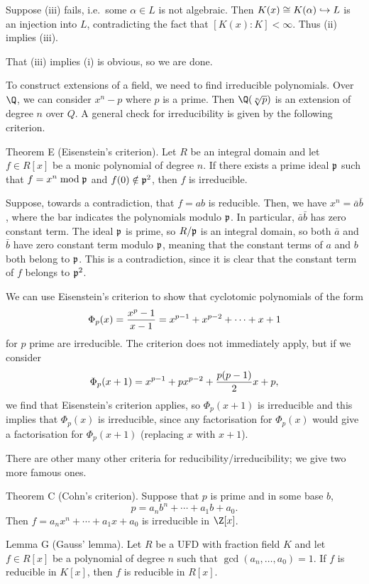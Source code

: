 Suppose (iii) fails, i.e.\ some $\alpha\in L$ is not algebraic. Then $K(x) \cong K(\alpha) \hookrightarrow L$ is an injection into $L$, contradicting the fact that $[K(x) : K] < \infty$. Thus (ii) implies (iii).

That (iii) implies (i) is obvious, so we are done.\slug

To construct extensions of a field, we need to find irreducible polynomials. Over $\Q$, we can consider $x^n - p$ where $p$ is a prime. Then $\Q(\root n\of p)$ is an extension of degree $n$ over $Q$. A general check for irreducibility is given by the following criterion.

\parenproclaim Theorem E (Eisenstein's criterion). Let $R$ be an integral domain and let $f\in R[x]$ be a monic polynomial of degree $n$. If there exists a prime ideal $\frak p$ such that $f = x^n \bmod \frak p$ and $f(0) \notin \frak p^2$, then $f$ is irreducible.

\proof Suppose, towards a contradiction, that $f = ab$ is reducible. Then, we have $x^n = \bar a \bar b$, where the bar indicates the polynomials modulo $\frak p$. In particular, $\bar a\bar b$ has zero constant term. The ideal $\frak p$ is prime, so $R/\frak p$ is an integral domain, so both $\bar a$ and $\bar b$ have zero constant term modulo $\frak p$, meaning that the constant terms of $a$ and $b$ both belong to $\frak p$. This is a contradiction, since it is clear that the constant term of $f$ belongs to $\frak p^2$.\slug

We can use Eisenstein's criterion to show that cyclotomic polynomials of the form
$$\Phi_p(x) = {x^p -1\over x-1} = x^{p-1} + x^{p-2} + \cdots + x + 1$$
for $p$ prime are irreducible. The criterion does not immediately apply, but if we consider
$$\Phi_p(x+1) = x^{p-1} + px^{p-2} + {p(p-1)\over 2}x + p,$$
we find that Eisenstein's criterion applies, so $\Phi_p(x+1)$ is irreducible and this implies that $\Phi_p(x)$ is irreducible, since any factorisation for $\Phi_p(x)$ would give a factorisation for $\Phi_p(x+1)$ (replacing $x$ with $x+1$).

There are other many other criteria for reducibility/irreducibility; we give two more famous ones.

\parenproclaim Theorem C (Cohn's criterion). Suppose that $p$ is prime and in some base $b$,
$$p = a_nb^n + \cdots + a_1b + a_0.$$
Then $f = a_nx^n + \cdots + a_1x + a_0$ is irreducible in $\Z[x]$.\slug

\parenproclaim Lemma G (Gauss' lemma). Let $R$ be a UFD with fraction field $K$ and let $f\in R[x]$ be a polynomial of degree $n$ such that $\gcd(a_n, \ldots, a_0) = 1$. If $f$ is reducible in $K[x]$, then $f$ is reducible in $R[x]$.\slug

